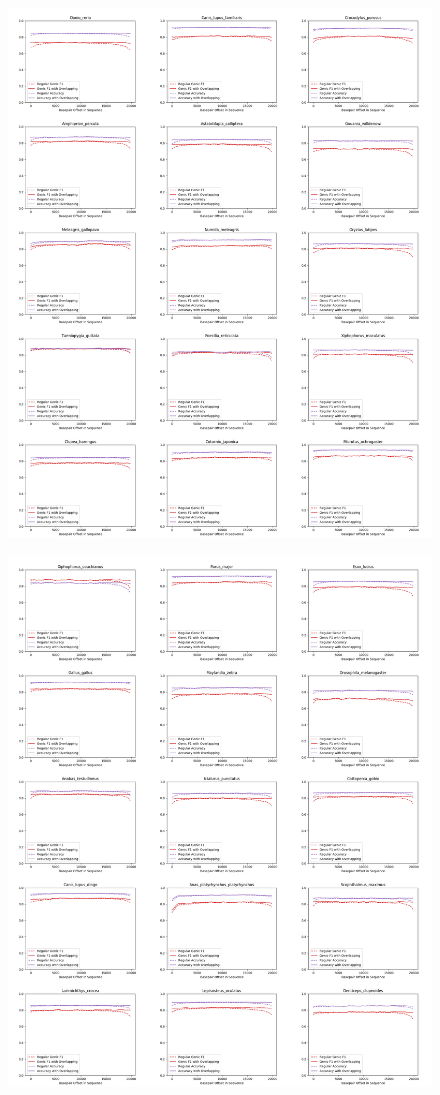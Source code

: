 \documentclass{article}
\begin{document}
\begin{figure}[!h]
\centerline{\includegraphics[width=1.2\textwidth]{images/overlapping/montage_animals3}}
\end{figure}
\begin{figure}[!h]
\centerline{\includegraphics[width=1.2\textwidth]{images/overlapping/montage_animals4}}
\end{figure}
\end{document}
